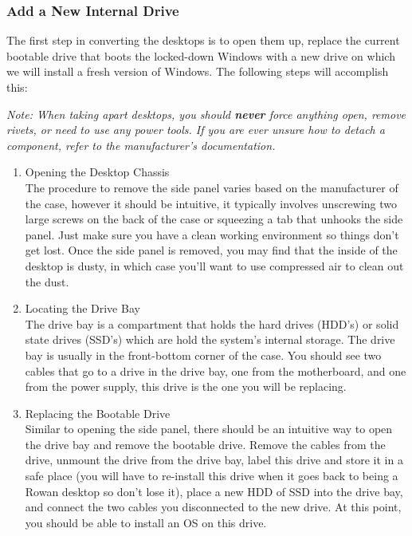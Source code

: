 \documentclass{article}
\begin{document}
\subsubsection{Add a New Internal Drive}
The first step in converting the desktops is to open them up, replace the current bootable drive that boots the locked-down Windows with a new drive on which we will install a
fresh version of Windows. The following steps will accomplish this:

\textit{Note: When taking apart desktops, you should \textbf{never} force anything open, remove rivets, or
        need to use any power tools. If you are ever unsure how to detach a component, refer to the manufacturer's documentation.}
\begin{enumerate}
    \item{Opening the Desktop Chassis}\\
        The procedure to remove the side panel varies based on the manufacturer of the case, however it should be intuitive, it typically involves unscrewing two large screws
        on the back of the case or squeezing a tab that unhooks the side panel. Just make sure you have a clean working environment so things don't get lost. Once the side
        panel is removed, you may find that the inside of the desktop is dusty, in which case you'll want to use compressed air to clean out the dust.

    \item{Locating the Drive Bay}\\
        The drive bay is a compartment that holds the hard drives (HDD's) or solid state drives (SSD's) which are hold the system's internal storage. The drive bay is usually
        in the front-bottom corner of the case. You should see two cables that go to a drive in the drive bay, one from the motherboard, and one from the power supply, this drive is the one you will be
        replacing.

    \item{Replacing the Bootable Drive}\\
        Similar to opening the side panel, there should be an intuitive way to open the drive bay and remove the bootable drive. Remove the cables from the drive, unmount the
        drive from the drive bay, label this drive and store it in a safe place (you will have to re-install this drive when it goes back to being a Rowan desktop so don't
        lose it), place a new HDD of SSD into the drive bay, and connect the two cables you disconnected to the new drive. At this point, you should be able to install an OS
        on this drive.


\end{enumerate}
\end{document}
